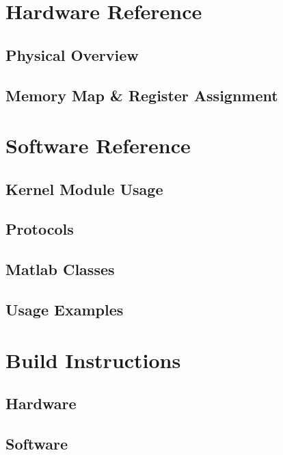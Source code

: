 \documentclass[12pt,a4paper,twoside,parskip=full]{scrreprt}
\begin{document}
\begin{appendix}
    \chapter{Hardware Reference}
    \section{Physical Overview}
    \section{Memory Map \& Register Assignment}
    \chapter{Software Reference}
    \section{Kernel Module Usage}
    \section{Protocols}
    \section{Matlab Classes}
    \section{Usage Examples}
    \chapter{Build Instructions}
    \section{Hardware}
    \section{Software}
\end{appendix}
\end{document}
